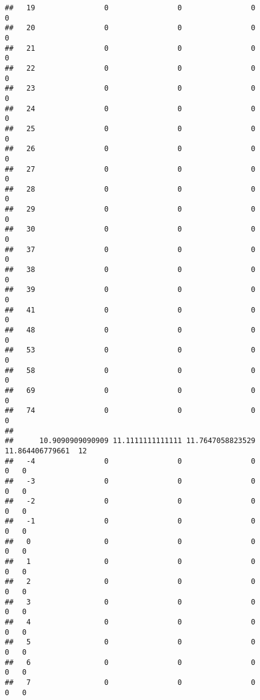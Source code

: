 \documentclass[]{article}
\begin{document}
\begin{verbatim}
##   19                0                0                0                0
##   20                0                0                0                0
##   21                0                0                0                0
##   22                0                0                0                0
##   23                0                0                0                0
##   24                0                0                0                0
##   25                0                0                0                0
##   26                0                0                0                0
##   27                0                0                0                0
##   28                0                0                0                0
##   29                0                0                0                0
##   30                0                0                0                0
##   37                0                0                0                0
##   38                0                0                0                0
##   39                0                0                0                0
##   41                0                0                0                0
##   48                0                0                0                0
##   53                0                0                0                0
##   58                0                0                0                0
##   69                0                0                0                0
##   74                0                0                0                0
##     
##      10.9090909090909 11.1111111111111 11.7647058823529 11.864406779661  12
##   -4                0                0                0               0   0
##   -3                0                0                0               0   0
##   -2                0                0                0               0   0
##   -1                0                0                0               0   0
##   0                 0                0                0               0   0
##   1                 0                0                0               0   0
##   2                 0                0                0               0   0
##   3                 0                0                0               0   0
##   4                 0                0                0               0   0
##   5                 0                0                0               0   0
##   6                 0                0                0               0   0
##   7                 0                0                0               0   0

\end{verbatim}
\end{document}
